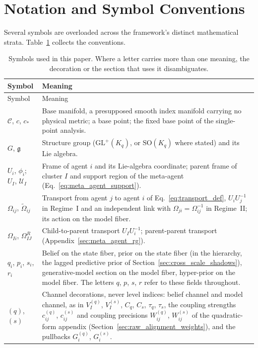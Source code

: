 \documentclass[11pt]{article}
\begin{document}
\section{Notation and Symbol Conventions}\label{sec:notation}

Several symbols are overloaded across the framework's distinct mathematical strata. Table~\ref{tab:notation} collects the conventions.

{\small
\setlength{\LTcapwidth}{\textwidth}
\begin{longtable}{@{}p{}p{}@{}}
\caption{Symbols used in this paper. Where a letter carries more than one meaning, the decoration or the section that uses it disambiguates.}\label{tab:notation}\\
\toprule
Symbol & Meaning \\
\midrule
\endfirsthead
\toprule
Symbol & Meaning \\
\midrule
\endhead
\bottomrule
\endfoot
$\mathcal{C}$, $c$, $c_*$ & Base manifold, a presupposed smooth index manifold carrying no physical metric; a base point; the fixed base point of the single-point analysis. \\
$G$, $\mathfrak{g}$ & Structure group ($\mathrm{GL}^+(K_q)$, or $\mathrm{SO}(K_q)$ where stated) and its Lie algebra. \\
$U_i$, $\phi_i$; $U_I$, $\mathcal{U}_I$ & Frame of agent $i$ and its Lie-algebra coordinate; parent frame of cluster $I$ and support region of the meta-agent (Eq.~\eqref{eq:meta_agent_support}). \\
$\Omega_{ij}$, $\widetilde{\Omega}_{ij}$ & Transport from agent $j$ to agent $i$ of Eq.~\eqref{eq:transport_def}, $U_iU_j^{-1}$ in Regime~I and an independent link with $\Omega_{ji}=\Omega_{ij}^{-1}$ in Regime~II; its action on the model fiber. \\
$\Omega_{Ii}$, $\Omega_{IJ}^R$ & Child-to-parent transport $U_IU_i^{-1}$; parent-parent transport (Appendix~\ref{sec:meta_agent_rg}). \\
$q_i$, $p_i$, $s_i$, $r_i$ & Belief on the state fiber, prior on the state fiber (in the hierarchy, the lagged predictive prior of Section~\ref{sec:cross_scale_shadows}), generative-model section on the model fiber, hyper-prior on the model fiber. The letters $q$, $p$, $s$, $r$ refer to these fields throughout. \\
$(q)$, $(s)$ & Channel decorations, never level indices: belief channel and model channel, as in $V_I^{(q)}$, $V_I^{(s)}$, $C_q$, $C_s$, $\tau_q$, $\tau_s$, the coupling strengths $c^{(q)}_{ij}$, $c^{(s)}_{ij}$ and coupling precisions $W^{(q)}_{ij}$, $W^{(s)}_{ij}$ of the quadratic-form appendix (Section~\ref{sec:raw_alignment_weights}), and the pullbacks $G^{(q)}_i$, $G^{(s)}_i$. \\

\end{longtable}}
\end{document}
